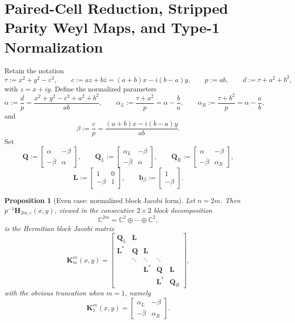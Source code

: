 \documentclass[11pt]{article}
\newtheorem{proposition}[theorem]{Proposition}
\begin{document}
\section{Paired-Cell Reduction, Stripped Parity Weyl Maps, and Type-1 Normalization}

Retain the notation
\[
\tau:=x^2+y^2-\varepsilon^2,
\qquad
c:=az+b\bar z=(a+b)x-i(b-a)y,
\qquad
p:=ab,
\qquad
d:=\tau+a^2+b^2,
\]
with \(z=x+iy\). Define the normalized parameters
\[
\alpha:=\frac{d}{p}
=\frac{x^2+y^2-\varepsilon^2+a^2+b^2}{ab},
\qquad
\alpha_L:=\frac{\tau+a^2}{p}
=\alpha-\frac{b}{a},
\qquad
\alpha_R:=\frac{\tau+b^2}{p}
=\alpha-\frac{a}{b},
\]
and
\[
\beta:=\frac{c}{p}
=\frac{(a+b)x-i(b-a)y}{ab}.
\]
Set
\[
\mathbf{Q}:=
\begin{bmatrix}
\alpha&-\beta\\
-\bar\beta&\alpha
\end{bmatrix},
\qquad
\mathbf{Q}_L:=
\begin{bmatrix}
\alpha_L&-\beta\\
-\bar\beta&\alpha
\end{bmatrix},
\qquad
\mathbf{Q}_R:=
\begin{bmatrix}
\alpha&-\beta\\
-\bar\beta&\alpha_R
\end{bmatrix},
\]
\[
\mathbf{L}:=
\begin{bmatrix}
1&0\\
-\beta&1
\end{bmatrix},
\qquad
\mathbf{b}_\beta:=
\begin{bmatrix}
1\\
-\beta
\end{bmatrix}.
\]

\begin{proposition}[Even case: normalized block Jacobi form]\label{prop:even-normalized-block-Jacobi}
Let \(n=2m\). Then \(p^{-1}\mathbf{H}_{2m,\varepsilon}(x,y)\), viewed in the consecutive \(2\times2\) block decomposition
\[
\mathbb{C}^{2m}=\mathbb{C}^2\oplus\cdots\oplus \mathbb{C}^2,
\]
is the Hermitian block Jacobi matrix
\[
\mathbf{K}_m^{\mathrm{ev}}(x,y)=
\begin{bmatrix}
\mathbf{Q}_L & \mathbf{L} \\
\mathbf{L}^* & \mathbf{Q} & \mathbf{L} \\
& \ddots & \ddots & \ddots \\
&& \mathbf{L}^* & \mathbf{Q} & \mathbf{L} \\
&&& \mathbf{L}^* & \mathbf{Q}_R
\end{bmatrix},
\]
with the obvious truncation when \(m=1\), namely
\[
\mathbf{K}_1^{\mathrm{ev}}(x,y)=
\begin{bmatrix}
\alpha_L&-\beta\\
-\bar\beta&\alpha_R
\end{bmatrix}.
\]
\end{proposition}
\end{document}
